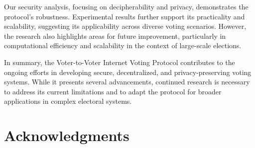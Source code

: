 \documentclass[runningheads]{llncs}
\begin{document}
Our security analysis, focusing on decipherability and privacy, demonstrates the protocol's robustness. Experimental results further support its practicality and scalability, suggesting its applicability across diverse voting scenarios. However, the research also highlights areas for future improvement, particularly in computational efficiency and scalability in the context of large-scale elections.

In summary, the Voter-to-Voter Internet Voting Protocol contributes to the ongoing efforts in developing secure, decentralized, and privacy-preserving voting systems. While it presents several advancements, continued research is necessary to address its current limitations and to adapt the protocol for broader applications in complex electoral systems.

\section{Acknowledgments}




\end{document}
